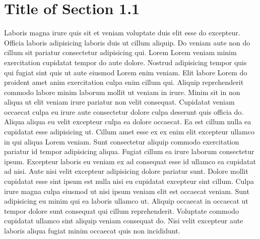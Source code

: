 \section{Title of Section 1.1}
Laboris magna irure quis sit et veniam voluptate duis elit esse do excepteur. Officia laboris adipisicing laboris duis ut cillum aliquip. Do veniam aute non do cillum sit pariatur consectetur adipisicing qui. Lorem Lorem veniam minim exercitation cupidatat tempor do aute dolore. Nostrud adipisicing tempor quis qui fugiat sint quis ut aute eiusmod Lorem enim veniam. Elit labore Lorem do proident amet anim exercitation culpa enim cillum qui. Aliquip reprehenderit commodo labore minim laborum mollit ut veniam in irure. Minim sit in non aliqua ut elit veniam irure pariatur non velit consequat. Cupidatat veniam occaecat culpa eu irure aute consectetur dolore culpa deserunt quis officia do. Aliqua aliqua eu velit excepteur culpa ea dolore occaecat. Ea est cillum nulla ea cupidatat esse adipisicing ut. Cillum amet esse ex ex enim elit excepteur ullamco in qui aliqua Lorem veniam. Sunt consectetur aliquip commodo exercitation pariatur id tempor adipisicing aliqua. Fugiat cillum ea irure laborum consectetur ipsum. Excepteur laboris eu veniam ex ad consequat esse id ullamco ea cupidatat ad nisi. Aute nisi velit excepteur adipisicing dolore pariatur sunt. Dolore mollit cupidatat esse sint ipsum est nulla nisi eu cupidatat excepteur sint cillum. Culpa irure magna culpa eiusmod ut nisi ipsum veniam elit est occaecat veniam. Sunt adipisicing eu minim qui ea laboris ullamco ut. Aliquip occaecat in occaecat ut tempor dolore sunt consequat qui cillum reprehenderit. Voluptate commodo cupidatat ullamco sint aliquip veniam consequat do. Nisi velit excepteur aute laboris aliqua fugiat minim occaecat quis non incididunt.
